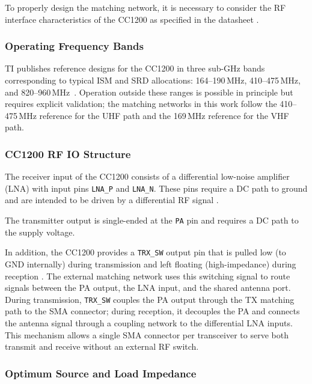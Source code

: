 To properly design the matching network, it is necessary to consider the RF interface characteristics of the CC1200 as specified in the datasheet \cite{cc1200}.

\subsubsection{Operating Frequency Bands}

TI publishes reference designs for the CC1200 in three sub-GHz bands corresponding to typical ISM and SRD allocations: 164--190\,MHz, 410--475\,MHz, and 820--960\,MHz~\cite{cc1200}. Operation outside these ranges is possible in principle but requires explicit validation; the matching networks in this work follow the 410--475\,MHz reference for the UHF path and the 169\,MHz reference for the VHF path.

\subsubsection{CC1200 RF IO Structure}

The receiver input of the CC1200 consists of a differential low-noise amplifier (LNA) with input pins \texttt{LNA\_P} and \texttt{LNA\_N}. These pins require a DC path to ground and are intended to be driven by a differential RF signal \cite{cc1200}.

The transmitter output is single-ended at the \texttt{PA} pin and requires a DC path to the supply voltage.

In addition, the CC1200 provides a \texttt{TRX\_SW} output pin that is pulled low (to GND internally) during transmission and left floating (high-impedance) during reception \cite{cc1200}. The external matching network uses this switching signal to route signals between the PA output, the LNA input, and the shared antenna port. During transmission, \texttt{TRX\_SW} couples the PA output through the TX matching path to the SMA connector; during reception, it decouples the PA and connects the antenna signal through a coupling network to the differential LNA inputs. This mechanism allows a single SMA connector per transceiver to serve both transmit and receive without an external RF switch.

\subsubsection{Optimum Source and Load Impedance}

